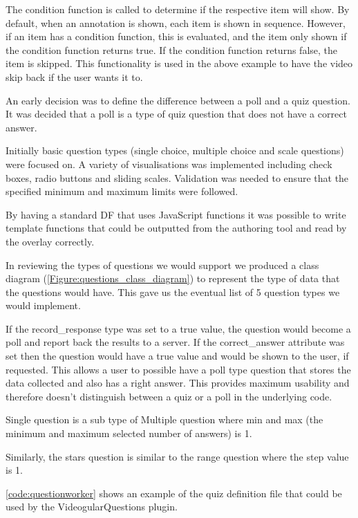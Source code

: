 The condition function is called to determine if the respective item will show. By default, when an annotation is shown, each item is shown in sequence. However, if an item has a condition function, this is evaluated, and the item only shown if the condition function returns true. If the condition function returns false, the item is skipped. This functionality is used in the above example to have the video skip back if the user wants it to.

An early decision was to define the difference between a poll and a quiz question. It was decided that a poll is a type of quiz question that does not have a correct answer.

Initially basic question types (single choice, multiple choice and scale questions) were focused on. A variety of visualisations was implemented including check boxes, radio buttons and sliding scales. Validation was needed to ensure that the specified minimum and maximum limits were followed.

By having a standard \gls{DF} that uses JavaScript functions it was possible to write template functions that could be outputted from the authoring tool and read by the overlay correctly.

In reviewing the types of questions we would support we produced a class diagram (\autoref{Figure:questions_class_diagram}) to represent the type of data that the questions would have. This gave us the eventual list of 5 question types we would implement.

If the record\_response type was set to a true value, the question would become a poll and report back the results to a server. If the correct\_answer attribute was set then the question would have a true value and would be shown to the user, if requested. This allows a user to possible have a poll type question that stores the data collected and also has a right answer. This provides maximum usability and therefore doesn't distinguish between a quiz or a poll in the underlying code.

Single question is a sub type of Multiple question where min and max (the minimum and maximum selected number of answers) is 1.

Similarly, the stars question is similar to the range question where the step value is 1.

\autoref{code:questionworker} shows an example of the quiz definition file that could be used by the VideogularQuestions plugin.

